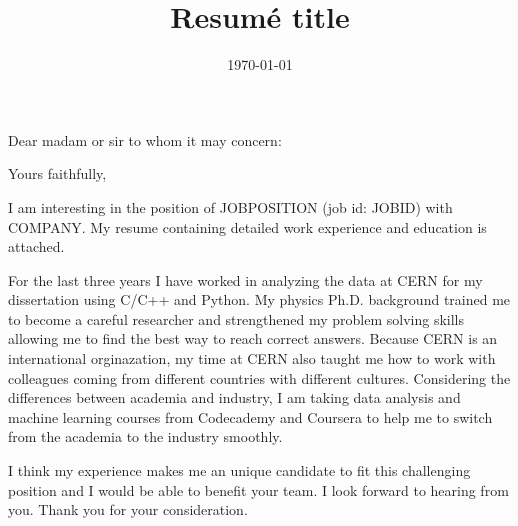 \documentclass[11pt,letterpaper]{moderncv}   %
\title{Resumé title}                               %
\begin{document}
%
%

\date{\today}

\opening{Dear madam or sir to whom it may concern:}
\closing{Yours faithfully,} %

\makelettertitle

%
%
%

\justifying
I am interesting in the position of JOBPOSITION (job id: JOBID) with COMPANY.
My resume containing detailed work experience and education is attached.

For the last three years I have worked in analyzing the data at CERN for my dissertation using C/C++ and Python.
My physics Ph.D. background trained me to become a careful researcher and strengthened my problem solving skills allowing me to find the best way to reach correct answers.
Because CERN is an international orginazation, my time at CERN also taught me how to work with colleagues coming from different countries with different cultures.
Considering the differences between academia and industry, I am taking data analysis and machine learning courses from Codecademy and Coursera to help me to switch from the academia to the industry smoothly.

I think my experience makes me an unique candidate to fit this challenging position and I would be able to benefit your team.
I look forward to hearing from you.
Thank you for your consideration.

\vspace{0.5cm}

\makeletterclosing
\end{document}
